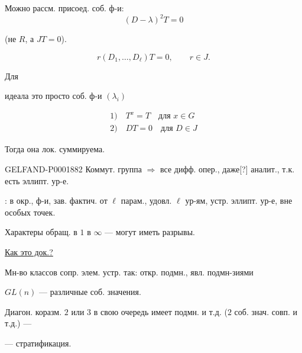 Можно рассм. присоед. соб. ф-и:
\begin{equation*}(D-\lambda)^2T=0\end{equation*}

(не $R$, а $JT=0$).

\begin{equation*}r(D_1,\ldots,D_\ell)T=0,\qquad r\in J.\end{equation*}

Для
идеала это просто соб. ф-и $(\lambda_i)$

\uline{}

\begin{gather*}
1)\quad T^x=T\quad\text{для }x\in G\\
2)\quad DT=0\quad\text{для }D\in J
\end{gather*}

Тогда она лок. суммируема.

\begin{GelfandAdjacentEvidence}{GELFAND-P000188}{2}
Коммут. группа $\Rightarrow$ все дифф. опер., даже[?] аналит., т.к. есть эллипт. ур-е.
\end{GelfandAdjacentEvidence}

: в окр., ф-и, зав. фактич. от $\ell$ парам., удовл. $\ell$ ур-ям, устр. эллипт. ур-е, вне особых точек.

Характеры обращ. в $1$ в $\infty$ — могут иметь разрывы.

\underline{Как это док.?}

Мн-во классов сопр. элем. устр. так: откр. подмн., явл. подмн-зиями

$GL(n)$ — различные соб. значения.

Диагон. коразм. $2$ или $3$ в свою очередь имеет подмн. и т.д. ($2$ соб. знач. совп. и т.д.) —

— стратификация.



